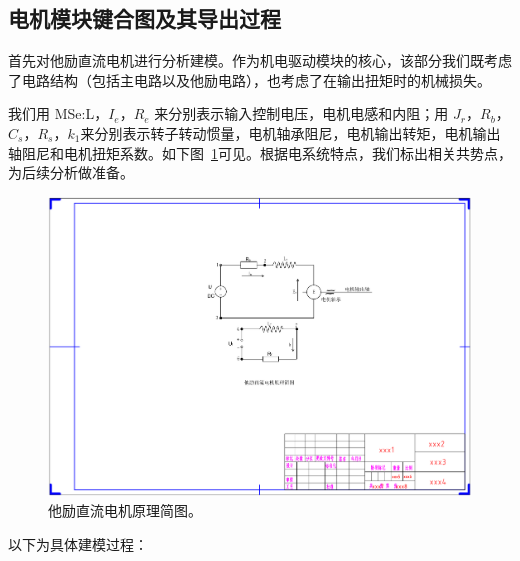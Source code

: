 \clearpage

\subsection{电机模块键合图及其导出过程}

首先对他励直流电机进行分析建模。作为机电驱动模块的核心，该部分我们既考虑了电路结构（包括主电路以及他励电路），也考虑了在输出扭矩时的机械损失。

我们用 MSe:L，$ I_e $，$ R_e $ 来分别表示输入控制电压，电机电感和内阻；用 $ J_r $，$ R_b $，$ C_s $，$ R_s $，$ k_1 $来分别表示转子转动惯量，电机轴承阻尼，电机输出转矩，电机输出轴阻尼和电机扭矩系数。如下图~\ref{fig:separately_excited_dc_motor}可见。根据电系统特点，我们标出相关共势点，为后续分析做准备。

\begin{figure}[!h]
	\centering
	\includegraphics[width=1.05\textwidth]{fig/separately_excited_dc_motor.pdf}
	\caption{他励直流电机原理简图。}\label{fig:separately_excited_dc_motor} %
\end{figure}

以下为具体建模过程：

